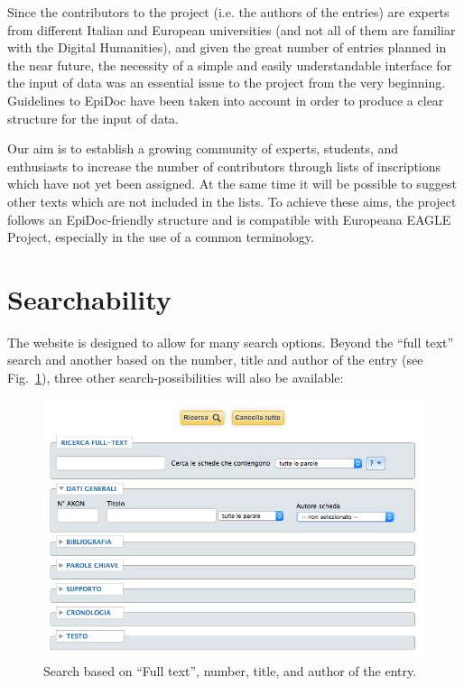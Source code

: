\documentclass[amsthm,ebook]{saparticle}
\begin{document}
\noindent Since the contributors to the project (i.e. the authors of the entries) are experts from different Italian and European
universities (and not all of them are familiar with the Digital Humanities), and given the great number of entries
planned in the near future, the necessity of a simple and easily understandable interface for the input of data was an
essential issue to the project from the very beginning. Guidelines to EpiDoc have been taken into account in order to
produce a clear structure for the input of data.

Our aim is to establish a growing community of experts, students, and enthusiasts to increase the number of contributors
through lists of inscriptions which have not yet been assigned. At the same time it will be possible to suggest
other texts which are not included in the lists. To achieve these aims, the project follows an EpiDoc-friendly
structure and is compatible with Europeana EAGLE Project, especially in the use of a common terminology. 







\section{Searchability}





\noindent The website is designed to allow for many search options. Beyond the ``full text'' search and another based on the number,
title and author of the entry (see Fig.~\ref{fig:3}), three other search-possibilities will also be available:

\begin{figure}[!hbp]
\centering
 \includegraphics[width=\columnwidth]{EAGLE2016FullPaperrevised-img003.png}
\caption{Search based on ``Full text'', number, title, and author of the entry.}
\label{fig:3}
\end{figure}
\end{document}
